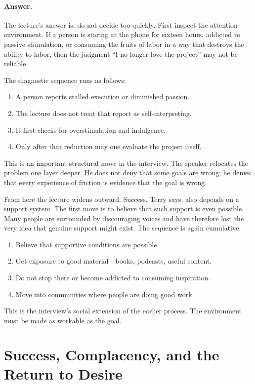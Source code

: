 \paragraph{Answer.} The lecture's answer is: do not decide too quickly. First inspect the attention-environment. If a person is staring at the phone for sixteen hours, addicted to passive stimulation, or consuming the fruits of labor in a way that destroys the ability to labor, then the judgment ``I no longer love the project'' may not be reliable.

The diagnostic sequence runs as follows:
\begin{enumerate}
\item A person reports stalled execution or diminished passion.
\item The lecture does not treat that report as self-interpreting.
\item It first checks for overstimulation and indulgence.
\item Only after that reduction may one evaluate the project itself.
\end{enumerate}

This is an important structural move in the interview. The speaker relocates the problem one layer deeper. He does not deny that some goals are wrong; he denies that every experience of friction is evidence that the goal is wrong.

From here the lecture widens outward. Success, Terry says, also depends on a support system. The first move is to believe that such support is even possible. Many people are surrounded by discouraging voices and have therefore lost the very idea that genuine support might exist. The sequence is again cumulative:
\begin{enumerate}
\item Believe that supportive conditions are possible.
\item Get exposure to good material---books, podcasts, useful content.
\item Do not stop there or become addicted to consuming inspiration.
\item Move into communities where people are doing good work.
\end{enumerate}
This is the interview's social extension of the earlier process. The environment must be made as workable as the goal.

\section{Success, Complacency, and the Return to Desire}

